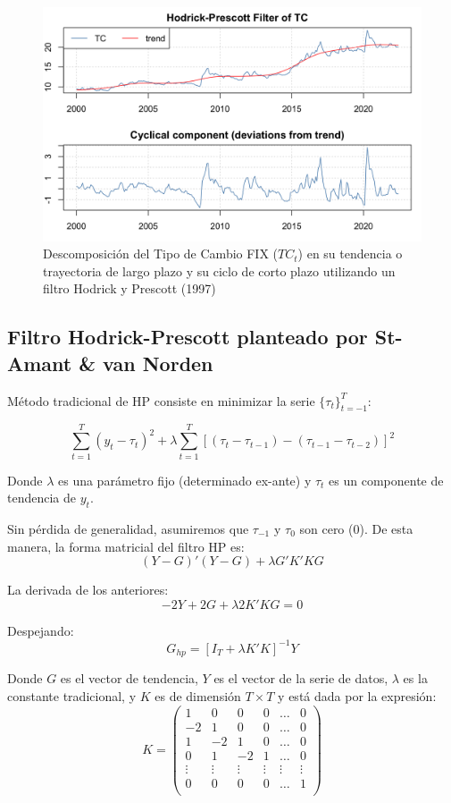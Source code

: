 \documentclass[
]{book}
\begin{document}
\begin{figure}

{\centering \includegraphics[width=0.95\linewidth]{Plots/G_TC_HP} 

}

\caption{Descomposición del Tipo de Cambio FIX ($TC_t$) en su tendencia o trayectoria de largo plazo y su ciclo de corto plazo utilizando un filtro Hodrick y Prescott (1997)}\label{fig:fig53}
\end{figure}

\hypertarget{filtro-hodrick-prescott-planteado-por-st-amant-van-norden}{%
\subsection{Filtro Hodrick-Prescott planteado por St-Amant \& van Norden}\label{filtro-hodrick-prescott-planteado-por-st-amant-van-norden}}

Método tradicional de HP consiste en minimizar la serie \(\{ \tau_t \}_{t=-1}^T\):

\[\sum_{t=1}^T (y_t - \tau_t)^2 + \lambda \sum_{t=1}^{T} [(\tau_{t} - \tau_{t-1}) - (\tau_{t-1} - \tau_{t-2})]^2\]

Donde \(\lambda\) es una parámetro fijo (determinado ex-ante) y \(\tau_t\) es un componente de tendencia de \(y_t\).

Sin pérdida de generalidad, asumiremos que \(\tau_{-1}\) y \(\tau_{0}\) son cero (0). De esta manera, la forma matricial del filtro HP es:
\[(Y - G)'(Y - G) + \lambda G' K' K G\]

La derivada de los anteriores:
\[-2 Y + 2 G + \lambda 2 K' K G = 0\]

Despejando:
\[G_{hp} = [I_T + \lambda K' K]^{-1} Y\]

Donde \(G\) es el vector de tendencia, \(Y\) es el vector de la serie de datos, \(\lambda\) es la constante tradicional, y \(K\) es de dimensión \(T \times T\) y está dada por la expresión:
\[K =
\begin{pmatrix}
1 & 0 & 0 & 0 & \ldots & 0 \\
-2 & 1 & 0 & 0 & \ldots & 0 \\
1 & -2 & 1 & 0 & \ldots & 0 \\
0 & 1 & -2 & 1 & \ldots & 0 \\
\vdots & \vdots &  \vdots &  \vdots &  \vdots &  \vdots \\
0 & 0 & 0 & 0 & \ldots & 1 \\
\end{pmatrix}
\]
\end{document}
